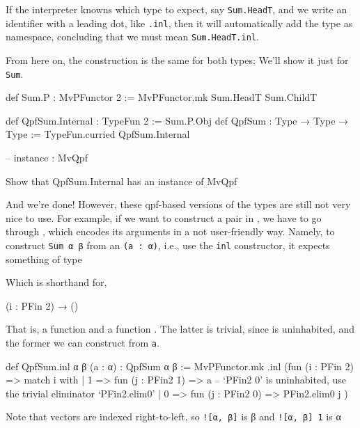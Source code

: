 \documentclass[titlepage]{report}
\newenvironment{remark}[1][Remark:]{\begin{trivlist}                         
    \item[\hskip \labelsep {\bfseries #1}]}{\end{trivlist}}
\newenvironment{todo}[1][Todo:]{\begin{trivlist}                         
    \item[\hskip \labelsep {\bfseries #1}]}{\end{trivlist}}
\begin{document}
\begin{remark}
    If the interpreter knowns which type to expect, say \texttt{Sum.HeadT}, and we write an identifier with a leading
    dot, like \texttt{.inl}, then it will automatically add the type as namespace, concluding that
    we must mean \texttt{Sum.HeadT.inl}.
\end{remark}
From here on, the construction is the same for both types;
We'll show it just for \texttt{Sum}.
\begin{center}
    \begin{leancode}
    def Sum.P  : MvPFunctor 2 := MvPFunctor.mk Sum.HeadT  Sum.ChildT

    
    def QpfSum.Internal : TypeFun 2  := Sum.P.Obj
    def QpfSum  : Type → Type → Type := TypeFun.curried QpfSum.Internal

    -- instance : MvQpf 
  \end{leancode}
\end{center}



\begin{todo}
    Show that QpfSum.Internal has an instance of MvQpf
\end{todo}

And we're done! However, these qpf-based versions of the types are still not very nice to use.
For example, if we want to construct a pair in , we have to go through ,
which encodes its arguments in a not user-friendly way. 
Namely, to construct \texttt{Sum α β} from an \texttt{(a : α)}, i.e., use the \texttt{inl} constructor, 
it expects something of type
\begin{center}
\end{center}
Which is shorthand for, 
\begin{center}
    (i : PFin 2) → ()
\end{center}
That is, a function  and a function .
The latter is trivial, since  is uninhabited, and the former we can construct from \texttt{a}.

\begin{leancode}
    def QpfSum.inl {α β} (a : α) : QpfSum α β :=
      MvPFunctor.mk .inl (fun (i : PFin 2) => match i with
        | 1 => fun (j : PFin2 1) => a
        -- `PFin2 0' is uninhabited, use the trivial eliminator `PFin2.elim0'
        | 0 => fun (j : PFin2 0) => PFin2.elim0 j
      )
\end{leancode}
\begin{remark}
    Note that vectors are indexed right-to-left, so \texttt{![α, β]} is β
    and \texttt{![α, β] 1} is α
\end{remark}
\end{document}
